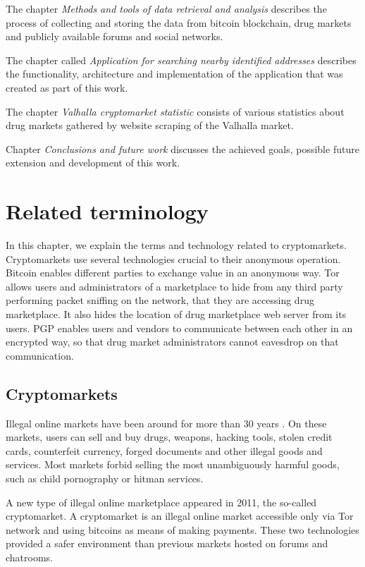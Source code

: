 \documentclass[
  digital, %
  table,   %
  lof,     %
  lot,     %
  oneside
]{fithesis3}
\begin{document}
The chapter \emph{Methods and tools of data retrieval and analysis} describes the process of collecting
and storing the data from bitcoin blockchain, drug markets and publicly available forums and social networks. 

The chapter called 
\emph{Application for searching nearby identified addresses}
describes the functionality, architecture and implementation of the application that was created as part of this work.

The chapter \emph{Valhalla cryptomarket statistic} consists of various statistics about
drug markets gathered by website scraping of the Valhalla market.

Chapter \emph{Conclusions and future work} discusses the achieved goals, possible future extension and development
of this work.


\chapter{Related terminology}

In this chapter, we explain the terms and technology related to cryptomarkets.
Cryptomarkets use several technologies crucial to their anonymous operation.
Bitcoin enables different parties to exchange value in an anonymous way.
Tor allows users and administrators of a marketplace to hide from any third party performing packet sniffing on the network,
that they are accessing drug marketplace. It also hides the location of drug marketplace web server from its users.
PGP enables users and vendors to communicate between each other in an encrypted way,
so that drug market administrators cannot eavesdrop on that communication.

\section{Cryptomarkets}

Illegal online markets have been around for more than 30 years \cite{motoyama2011analysis}.
On these markets, users can sell and buy drugs, weapons, hacking tools, stolen credit cards,
counterfeit currency, forged documents and other illegal goods and services.
Most markets forbid selling the most unambiguously harmful goods, such as child pornography or hitman services.

A new type of illegal online marketplace appeared in 2011, the so-called cryptomarket. 
A cryptomarket is an illegal online market accessible only via Tor network and using bitcoins
as means of making payments. These two technologies provided a safer environment
than previous markets hosted on forums and chatrooms.
\end{document}
